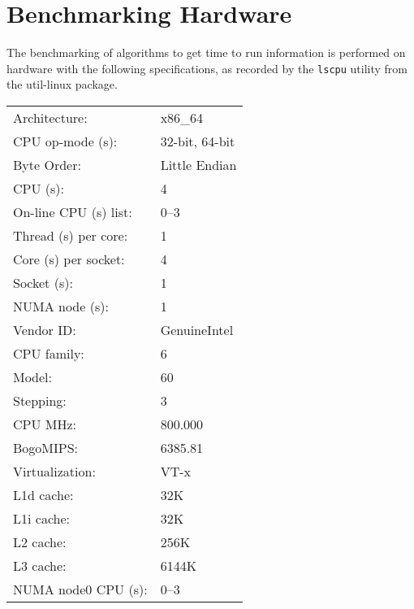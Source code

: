 
\chapter{Benchmarking Hardware}
\label{app:benchmarking_hardware}

The benchmarking of algorithms to get time to run information is performed on
hardware with the following specifications, as recorded by the \texttt{lscpu}
utility from the util-linux package\cite{lscpu}.

\begin{tabular}{l l}
	Architecture:          & x86\_64 \\
	CPU op-mode  (s):      & 32-bit, 64-bit \\
	Byte Order:            & Little Endian \\
	CPU (s):               & 4 \\
	On-line CPU (s) list:  & 0--3 \\
	Thread (s) per core:   & 1 \\
	Core (s) per socket:   & 4 \\
	Socket (s):            & 1 \\
	NUMA node (s):         & 1 \\
	Vendor ID\@:           & GenuineIntel \\
	CPU family:            & 6 \\
	Model:                 & 60 \\
	Stepping:              & 3 \\
	CPU MHz:               & 800.000 \\
	BogoMIPS\@:            & 6385.81 \\
	Virtualization:        & VT-x \\
	L1d cache:             & 32K \\
	L1i cache:             & 32K \\
	L2 cache:              & 256K \\
	L3 cache:              & 6144K \\
	NUMA node0 CPU (s):    & 0--3 \\
\end{tabular}
